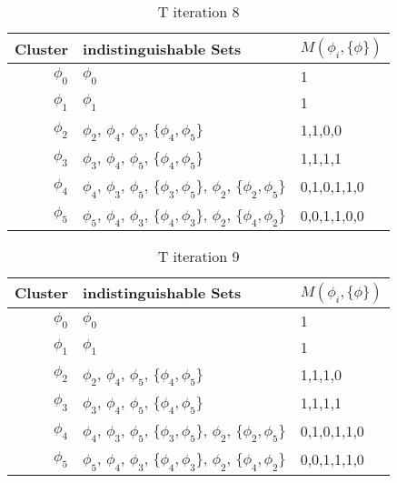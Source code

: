 \documentclass{article}
\begin{document}
				\begin{table}[h!]
				  \begin{center}
				    \caption{T iteration 8}
				    \label{tab:table10}
				    \begin{tabular}{r|l|l}
				      Cluster & indistinguishable Sets & $M(\phi_i, \{\phi\})$\\
				      \hline
				      $\phi_0$ & $\phi_0$ & 1\\
				      $\phi_1$ & $\phi_1$ & 1\\
				      $\phi_2$ & $\phi_2$, $\phi_4$, $\phi_5$, $\{\phi_4,\phi_5\}$ & 1,1,0,0\\
				      $\phi_3$ & $\phi_3$, $\phi_4$, $\phi_5$, $\{\phi_4,\phi_5\}$ & 1,1,1,1\\
				      $\phi_4$ & $\phi_4$, $\phi_3$, $\phi_5$, $\{\phi_3,\phi_5\}$, $\phi_2$, $\{\phi_2,\phi_5\}$ & 0,1,0,1,1,0\\
				      $\phi_5$ & $\phi_5$, $\phi_4$, $\phi_3$, $\{\phi_4,\phi_3\}$, $\phi_2$, $\{\phi_4,\phi_2\}$ & 0,0,1,1,0,0\\
				    \end{tabular}
				  \end{center}
				\end{table}

				\begin{table}[h!]
				  \begin{center}
				    \caption{T iteration 9}
				    \label{tab:table11}
				    \begin{tabular}{r|l|l}
				      Cluster & indistinguishable Sets & $M(\phi_i, \{\phi\})$\\
				      \hline
				      $\phi_0$ & $\phi_0$ & 1\\
				      $\phi_1$ & $\phi_1$ & 1\\
				      $\phi_2$ & $\phi_2$, $\phi_4$, $\phi_5$, $\{\phi_4,\phi_5\}$ & 1,1,1,0\\
				      $\phi_3$ & $\phi_3$, $\phi_4$, $\phi_5$, $\{\phi_4,\phi_5\}$ & 1,1,1,1\\
				      $\phi_4$ & $\phi_4$, $\phi_3$, $\phi_5$, $\{\phi_3,\phi_5\}$, $\phi_2$, $\{\phi_2,\phi_5\}$ & 0,1,0,1,1,0\\
				      $\phi_5$ & $\phi_5$, $\phi_4$, $\phi_3$, $\{\phi_4,\phi_3\}$, $\phi_2$, $\{\phi_4,\phi_2\}$ & 0,0,1,1,1,0\\
				    \end{tabular}
				  \end{center}
				\end{table}
\end{document}
